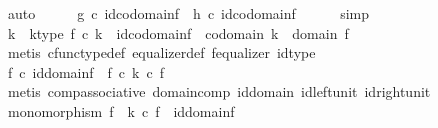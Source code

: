 \begin{isabellebody}
\ auto\isanewline
\ \ \isamarkupfalse%
\ \isamarkupfalse%
\ {\isachardoublequoteopen}g\ {\isasymcirc}\isactrlsub c\ id{\isacharparenleft}{\kern0pt}codomain{\isacharparenleft}{\kern0pt}f{\isacharparenright}{\kern0pt}{\isacharparenright}{\kern0pt}\ {\isacharequal}{\kern0pt}\ h\ {\isasymcirc}\isactrlsub c\ id{\isacharparenleft}{\kern0pt}codomain{\isacharparenleft}{\kern0pt}f{\isacharparenright}{\kern0pt}{\isacharparenright}{\kern0pt}{\isachardoublequoteclose}\isanewline
\ \ \ \ \isamarkupfalse%
\ simp\isanewline
\ \ \isamarkupfalse%
\ \isamarkupfalse%
\ k\ \ k{\isacharunderscore}{\kern0pt}type{\isacharcolon}{\kern0pt}\ {\isachardoublequoteopen}f\ {\isasymcirc}\isactrlsub c\ k\ {\isacharequal}{\kern0pt}\ id{\isacharparenleft}{\kern0pt}codomain{\isacharparenleft}{\kern0pt}f{\isacharparenright}{\kern0pt}{\isacharparenright}{\kern0pt}\ {\isasymand}\ codomain\ k\ {\isacharequal}{\kern0pt}\ domain\ f{\isachardoublequoteclose}\isanewline
\ \ \ \ \isamarkupfalse%
\ {\isacharparenleft}{\kern0pt}metis\ cfunc{\isacharunderscore}{\kern0pt}type{\isacharunderscore}{\kern0pt}def\ equalizer{\isacharunderscore}{\kern0pt}def\ f{\isacharunderscore}{\kern0pt}equalizer\ id{\isacharunderscore}{\kern0pt}type{\isacharparenright}{\kern0pt}\isanewline
\ \ \isamarkupfalse%
\ \isamarkupfalse%
\ {\isachardoublequoteopen}f\ {\isasymcirc}\isactrlsub c\ id{\isacharparenleft}{\kern0pt}domain{\isacharparenleft}{\kern0pt}f{\isacharparenright}{\kern0pt}{\isacharparenright}{\kern0pt}\ {\isacharequal}{\kern0pt}\ f\ {\isasymcirc}\isactrlsub c\ {\isacharparenleft}{\kern0pt}k\ {\isasymcirc}\isactrlsub c\ f{\isacharparenright}{\kern0pt}{\isachardoublequoteclose}\isanewline
\ \ \ \ \isamarkupfalse%
\ {\isacharparenleft}{\kern0pt}metis\ comp{\isacharunderscore}{\kern0pt}associative\ domain{\isacharunderscore}{\kern0pt}comp\ id{\isacharunderscore}{\kern0pt}domain\ id{\isacharunderscore}{\kern0pt}left{\isacharunderscore}{\kern0pt}unit\ id{\isacharunderscore}{\kern0pt}right{\isacharunderscore}{\kern0pt}unit{\isacharparenright}{\kern0pt}\isanewline
\ \ \isamarkupfalse%
\ \isamarkupfalse%
\ {\isachardoublequoteopen}monomorphism\ f\ {\isasymLongrightarrow}\ k\ {\isasymcirc}\isactrlsub c\ f\ {\isacharequal}{\kern0pt}\ id{\isacharparenleft}{\kern0pt}domain{\isacharparenleft}{\kern0pt}f{\isacharparenright}{\kern0pt}{\isacharparenright}{\kern0pt}{\isachardoublequoteclose}\isanewline
\ \ \ \ \isamarkupfalse%

\end{isabellebody}
